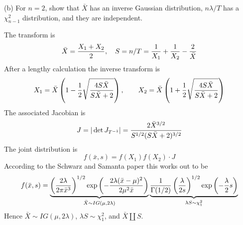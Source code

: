 \documentclass[12pt]{article}
\begin{document}
\bigskip
\noindent
(b) For $n=2$, show that $\bar X$ has an inverse Gaussian
distribution, $n\lambda/T$ has a $\chi^2_{n-1}$ distribution,
and they are independent.


\bigskip
\noindent
The transform is
$$\bar X={X_1+X_2\over2},\quad
S=n/T={1\over X_1}+{1\over X_2}-{2\over\bar X}$$
After a lengthy calculation the inverse transform is
$$
X_1=\bar X\left(1-{1\over2}\sqrt{4S\bar X\over S\bar X+2}\right),
\qquad
X_2=\bar X\left(1+{1\over2}\sqrt{4S\bar X\over S\bar X+2}\right)
$$
The associated Jacobian is
$$J=|\det J_{T^{-1}}|={2\bar X^{3/2}\over S^{1/2}(S\bar X+2)^{3/2}}$$
The joint distribution is
$$f(\bar x,s)=f(X_1)f(X_2)\cdot J$$
According to the Schwarz and Samanta paper this works out to be
$$f(\bar x,s)=
\underbrace{
\left({2\lambda\over2\pi\bar x^3}\right)^{1/2}
\exp\left(-{2\lambda(\bar x-\mu)^2\over2\mu^2\bar x}\right)
}_{\bar X\sim IG(\mu,2\lambda)}
\underbrace{
{1\over\Gamma(1/2)}\left(\lambda\over2s\right)^{1/2}
\exp\left(-{\lambda\over2}s\right)
}_{\lambda S\sim\chi^2_1}
$$
Hence $\bar X\sim IG(\mu,2\lambda)$,
$\lambda S\sim\chi^2_1$, and $\bar X\amalg S$.
\end{document}

